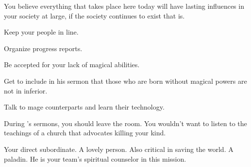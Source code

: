 \documentclass[char]{guildcamp3}
\begin{document}
You believe everything that takes place here today will have lasting influences in your society at large, if the society continues to exist that is.

\begin{itemz}[Goals]
  \item Keep your people in line.
  \item Organize progress reports.
  \item Be accepted for your lack of magical abilities.
  \item Get \cPaladin{} to include in his sermon that those who are born without magical powers are not in inferior.
  \item Talk to mage counterparts and learn their technology.
\end{itemz}

\begin{itemz}[Notes]
	\item During \cPaladin{\formal}'s sermons, you should leave the room. You wouldn't want to listen to the teachings of a church that advocates killing your kind. 
\end{itemz}


\begin{contacts}
  \contact{\cNobleTwo{}} Your direct subordinate. 
  \contact{\cMageOne{}} A lovely person. Also critical in saving the world.
  \contact{\cPaladin{}} A paladin. He is your team's spiritual counselor in this mission.
\end{contacts}
\end{document}
